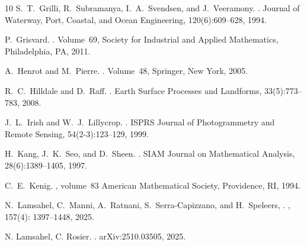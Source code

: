 \documentclass[11pt]{article}
\begin{document}
\begin{thebibliography}{10}
S.~T.~Grilli, R.~Subramanya, I.~A.~Svendsen, and J.~Veeramony.
.
\newblock Journal of Waterway, Port, Coastal, and Ocean Engineering, 120(6):609--628, 1994.


P.~Grisvard.
.
\newblock Volume~69, Society for Industrial and Applied Mathematics, Philadelphia, PA, 2011.




A.~Henrot and M.~Pierre.
.
\newblock Volume~48, Springer, New York, 2005.

R.~C.~Hilldale and D.~Raff.
.
\newblock Earth Surface Processes and Landforms, 33(5):773--783, 2008.


J.~L.~Irish and W.~J.~Lillycrop.
.
\newblock ISPRS Journal of Photogrammetry and Remote Sensing, 54(2-3):123--129, 1999.








H.~Kang, J.~K.~Seo, and D.~Sheen.
.
\newblock SIAM Journal on Mathematical Analysis, 28(6):1389--1405, 1997.

C.~E.~Kenig.
, volume~83
\newblock American Mathematical Society, Providence, RI, 1994.



N.~Lamsahel, C.~Manni, A.~Ratnani, S.~Serra-Capizzano, and H.~Speleers,
.
, 157(4): 1397--1448, 2025.

 N. Lamsahel, C. Rosier.
.
\newblock arXiv:2510.03505, 2025.


\end{thebibliography}
\end{document}
